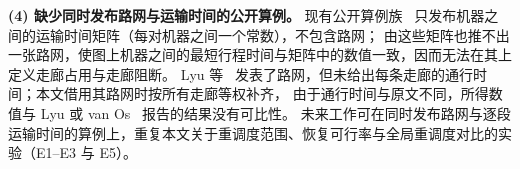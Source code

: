 \documentclass[manuscript,screen,review]{acmart}
\begin{document}
\textbf{(4) 缺少同时发布路网与运输时间的公开算例。}
现有公开算例族~\cite{homayouni2021production,fontes2023hybrid} 只发布机器之间的运输时间矩阵（每对机器之间一个常数），不包含路网；
由这些矩阵也推不出一张路网，使图上机器之间的最短行程时间与矩阵中的数值一致，因而无法在其上定义走廊占用与走廊阻断。
Lyu 等~\cite{lyu2019approach} 发表了路网，但未给出每条走廊的通行时间；本文借用其路网时按所有走廊等权补齐，
由于通行时间与原文不同，所得数值与 Lyu 或 van Os~\cite{vanos2026exact} 报告的结果没有可比性。
未来工作可在同时发布路网与逐段运输时间的算例上，重复本文关于重调度范围、恢复可行率与全局重调度对比的实验（E1--E3 与 E5）。



\end{document}
